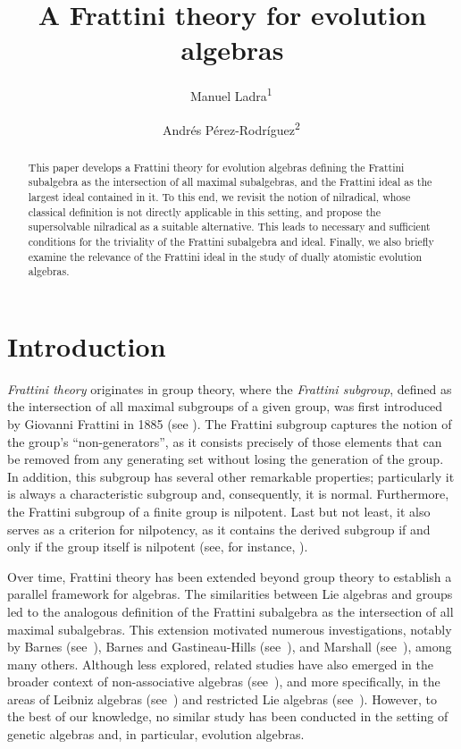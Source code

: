 \documentclass[12pt,reqno]{amsart}
\title[A Frattini theory for evolution algebras]{A Frattini theory for evolution algebras}
\author[M. Ladra]{Manuel Ladra\textsuperscript{1}\,\orcidlink{0000-0002-0543-4508}}
\author[A. Pérez-Rodríguez]{Andrés Pérez-Rodríguez\textsuperscript{2}\,\orcidlink{0009-0007-1095-5328}}
\theoremstyle{definition}
\theoremstyle{remark}
\numberwithin{equation}{section}
\begin{document}
\begin{abstract}
	This paper develops a Frattini theory for evolution algebras defining the Frattini subalgebra as the intersection of all maximal subalgebras, and the Frattini ideal as the largest ideal contained in it. To this end, we revisit the notion of nilradical, whose classical definition is not directly applicable in this setting, and propose the supersolvable nilradical as a suitable alternative. This leads to necessary and sufficient conditions for the triviality of the Frattini subalgebra and ideal. Finally, we also briefly examine the relevance of the Frattini ideal in the study of dually atomistic evolution algebras.
\end{abstract}

\maketitle

\tableofcontents

\section{Introduction}

\textit{Frattini theory} originates in group theory, where the \textit{Frattini subgroup}, defined as the intersection of all maximal subgroups of a given group, was first introduced by Giovanni Frattini in 1885 (see \cite{F_1885_origin}). The Frattini subgroup captures the notion of the group's ``non-generators'', as it consists precisely of those elements that can be removed from any generating set without losing the generation of the group. In addition, this subgroup has several other remarkable properties; particularly it is always a characteristic subgroup and, consequently, it is normal. Furthermore, the Frattini subgroup of a finite group is nilpotent. Last but not least, it also serves as a criterion for nilpotency, as it contains the derived subgroup if and only if the group itself is nilpotent (see, for instance, \cite[pp.~156--158]{H_59_grouptheory}).

Over time, Frattini theory has been extended beyond group theory to establish a parallel framework for algebras. The similarities between Lie algebras and groups led to the analogous definition of the Frattini subalgebra as the intersection of all maximal subalgebras. This extension motivated numerous investigations, notably by Barnes (see~\cite{B_67_cohom}), Barnes and Gastineau-Hills (see~\cite{BG_68_Lie}), and Marshall (see~\cite{M_67_frat}), among many others. Although less explored, related studies have also emerged in the broader context of non-associative algebras (see~\cite{frat_towers}), and more specifically, in the areas of Leibniz algebras (see~\cite{frat_leib}) and restricted Lie algebras (see~\cite{LT_85_rest}). However, to the best of our knowledge, no similar study has been conducted in the setting of genetic algebras and, in particular, evolution algebras.
\end{document}
